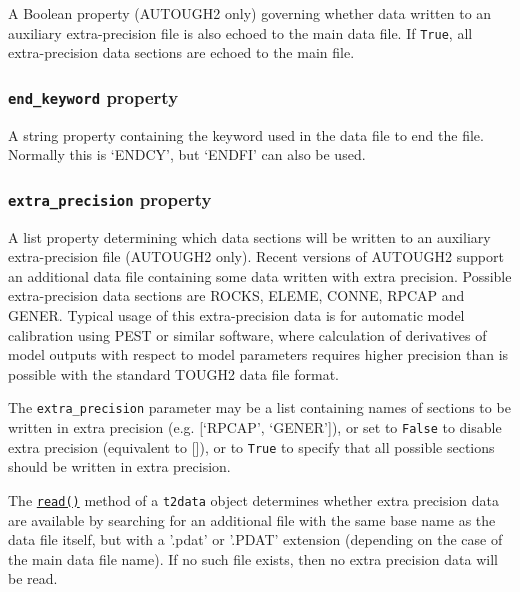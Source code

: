 A Boolean property (AUTOUGH2 only) governing whether data written to an auxiliary extra-precision file is also echoed to the main data file.  If \texttt{True}, all extra-precision data sections are echoed to the main file.

\begin{snugshade}
\subsubsection{\texttt{end\_keyword} property}
\end{snugshade}
\label{sec:t2data:end_keyword}

A string property containing the keyword used in the data file to end the file.  Normally this is `ENDCY', but `ENDFI' can also be used.

\begin{snugshade}
\subsubsection{\texttt{extra\_precision} property}
\end{snugshade}
\label{sec:t2data:extra_precision}

A list property determining which data sections will be written to an auxiliary extra-precision file (AUTOUGH2 only).  Recent versions of AUTOUGH2 support an additional data file containing some data written with extra precision.  Possible extra-precision data sections are ROCKS, ELEME, CONNE, RPCAP and GENER.  Typical usage of this extra-precision data is for automatic model calibration using PEST or similar software, where calculation of derivatives of model outputs with respect to model parameters requires higher precision than is possible with the standard TOUGH2 data file format.

The \texttt{extra\_precision} parameter may be a list containing names of sections to be written in extra precision (e.g. [`RPCAP', `GENER']), or set to \texttt{False} to disable extra precision (equivalent to []), or to \texttt{True} to specify that all possible sections should be written in extra precision.

The \hyperref[sec:t2data:read]{\texttt{read()}} method of a \texttt{t2data} object determines whether extra precision data are available by searching for an additional file with the same base name as the data file itself, but with a '.pdat' or '.PDAT' extension (depending on the case of the main data file name).  If no such file exists, then no extra precision data will be read.

